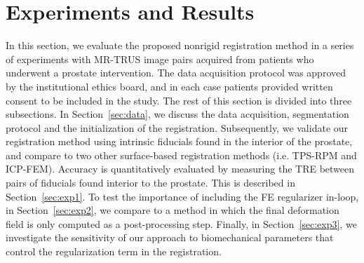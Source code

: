 \documentclass[journal]{IEEEtran}
\begin{document}
\section{Experiments and Results}
In this section, we evaluate the proposed nonrigid registration method in a series of experiments with MR-TRUS image pairs acquired from patients who underwent a prostate intervention. The data acquisition protocol was approved by the institutional ethics board, and in each case patients provided written consent to be included in the study. The rest of this section is divided into three subsections. In Section~\ref{sec:data}, we discuss the data acquisition, segmentation protocol and the initialization of the registration. Subsequently, we validate our registration method using intrinsic fiducials found in the interior of the prostate, and compare to two other surface-based registration methods (i.e. TPS-RPM and ICP-FEM). Accuracy is quantitatively evaluated by measuring the TRE between pairs of fiducials found interior to the prostate. This is described in Section~\ref{sec:exp1}. To test the importance of including the FE regularizer in-loop, in Section~\ref{sec:exp2}, we compare to a method in which the final deformation field is only computed as a post-processing step. Finally, in Section~\ref{sec:exp3}, we investigate the sensitivity of our approach to biomechanical parameters that control the regularization term in the registration.
\end{document}
